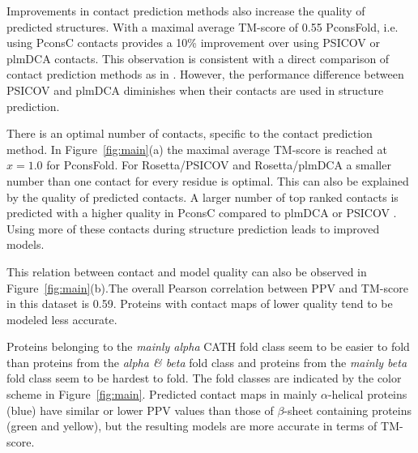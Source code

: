 \documentclass{bioinfo}
\begin{document}
Improvements in contact prediction methods also increase the quality
of predicted structures. With a maximal average TM-score of 0.55
PconsFold, i.e. using PconsC contacts provides a 10\% improvement
over using PSICOV or plmDCA contacts. This observation is consistent
with a direct comparison of contact prediction methods as in
\citeauthor{skwark_PconsC:_2013}
\citeyear{skwark_PconsC:_2013}. However, the performance difference
between PSICOV and plmDCA diminishes when their contacts are used in
structure prediction. 


There is an optimal number of contacts, specific to the contact
prediction method. In Figure~\ref{fig:main}(a) the maximal average
TM-score is reached at $x=1.0$ for PconsFold. For Rosetta/PSICOV and
Rosetta/plmDCA a smaller number than one contact for every residue 
is optimal. This can also be explained by the quality of
predicted contacts. A larger number of top ranked contacts is
predicted with a higher quality in PconsC compared to plmDCA or PSICOV
\cite[]{skwark_PconsC:_2013}. Using more of these contacts during
structure prediction leads to improved models. 


This relation between contact and model quality can also be observed
in Figure~\ref{fig:main}(b).The overall Pearson correlation between PPV and TM-score in
this dataset is 0.59. Proteins with contact maps of lower quality tend
to be modeled less accurate. 


Proteins belonging to the {\it
 mainly alpha} CATH fold class seem to be easier to fold than
proteins from the {\it alpha \& beta} fold class and proteins from the
{\it mainly beta} fold class seem to be hardest to fold. The fold
classes are indicated by the color scheme in Figure~\ref{fig:main}. Predicted contact maps in mainly $\alpha$-helical proteins (blue)
have similar or lower PPV values than those of $\beta$-sheet
containing proteins (green and yellow), but the resulting models are
more accurate in terms of TM-score.
\end{document}
